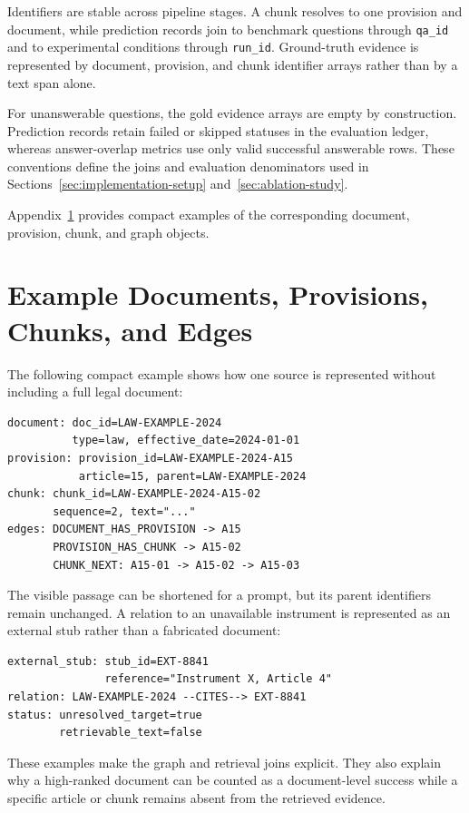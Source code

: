 Identifiers are stable across pipeline stages. A chunk resolves to one provision and document, while prediction records join to benchmark questions through \texttt{qa\_id} and to experimental conditions through \texttt{run\_id}. Ground-truth evidence is represented by document, provision, and chunk identifier arrays rather than by a text span alone.

For unanswerable questions, the gold evidence arrays are empty by construction. Prediction records retain failed or skipped statuses in the evaluation ledger, whereas answer-overlap metrics use only valid successful answerable rows. These conventions define the joins and evaluation denominators used in Sections~\ref{sec:implementation-setup} and~\ref{sec:ablation-study}.

Appendix~\ref{app:example-objects} provides compact examples of the corresponding document, provision, chunk, and graph objects.

\section{Example Documents, Provisions, Chunks, and Edges}
\label{app:example-objects}

The following compact example shows how one source is represented without
including a full legal document:

{\scriptsize
\begin{verbatim}
document: doc_id=LAW-EXAMPLE-2024
          type=law, effective_date=2024-01-01
provision: provision_id=LAW-EXAMPLE-2024-A15
           article=15, parent=LAW-EXAMPLE-2024
chunk: chunk_id=LAW-EXAMPLE-2024-A15-02
       sequence=2, text="..."
edges: DOCUMENT_HAS_PROVISION -> A15
       PROVISION_HAS_CHUNK -> A15-02
       CHUNK_NEXT: A15-01 -> A15-02 -> A15-03
\end{verbatim}
}

The visible passage can be shortened for a prompt, but its parent identifiers
remain unchanged. A relation to an unavailable instrument is represented as
an external stub rather than a fabricated document:

{\scriptsize
\begin{verbatim}
external_stub: stub_id=EXT-8841
               reference="Instrument X, Article 4"
relation: LAW-EXAMPLE-2024 --CITES--> EXT-8841
status: unresolved_target=true
        retrievable_text=false
\end{verbatim}
}

These examples make the graph and retrieval joins explicit. They also explain
why a high-ranked document can be counted as a document-level success while a
specific article or chunk remains absent from the retrieved evidence.

